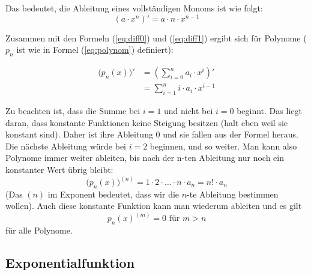 \noindent Das bedeutet, die Ableitung eines vollständigen Monoms ist wie folgt:
\begin{equation}
\left( a\cdot x^n \right)' = a\cdot n\cdot x^{n-1}
\end{equation}


Zusammen mit den Formeln (\ref{eq:diff0}) und (\ref{eq:diff1}) ergibt sich für Polynome ($p_n$ ist wie in Formel (\ref{eq:polynom}) definiert):

\begin{equation}
\begin{split}
\big( p_n(x) \big)' &= \left( \sum_{i=0}^{n} a_i \cdot x^i \right)' \\
&= \sum_{i=1}^{n} i\cdot a_i \cdot x^{i-1}
\end{split}
\end{equation}

Zu beachten ist, dass die Summe bei $i=1$ und nicht bei $i=0$ beginnt. Das liegt daran, dass konstante Funktionen keine Steigung besitzen (halt eben weil sie konstant sind). Daher ist ihre Ableitung 0 und sie fallen aus der Formel heraus. Die nächste Ableitung würde bei $i=2$ beginnen, und so weiter. Man kann also Polynome immer weiter ableiten, bis nach der n-ten Ableitung nur noch ein konstanter Wert übrig bleibt:
\begin{equation*}
\big( p_n(x)\big)^{(n)} = 1\cdot 2 \cdot \dots \cdot n \cdot a_n = n! \cdot a_n
\end{equation*}
(Das $(n)$ im Exponent bedeutet, dass wir die $n$-te Ableitung bestimmen wollen). Auch diese konstante Funktion kann man wiederum ableiten und es gilt 
\begin{equation*}
p_n(x)^{(m)} = 0 \text{ für } m>n
\end{equation*}
für alle Polynome.


\subsection{Exponentialfunktion}\label{chap:diffexp}

